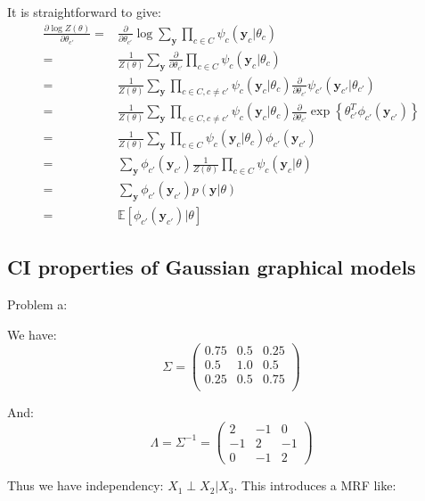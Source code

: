 \documentclass[UTF8]{ctexart}
\begin{document}
It is straightforward to give:
\begin{align}
\frac{\partial \log Z(\theta)}{\partial \theta_{c'}} = &\frac{\partial}{\partial \theta_{c'}}\log \sum_{\textbf{y}}\prod_{c \in C}\psi_{c}(\textbf{y}_{c}|\theta_{c}) \nonumber \\
=&\frac{1}{Z(\theta)}\sum_{\textbf{y}}\frac{\partial}{\partial\theta_{c'}}\prod_{c \in C}\psi_{c}(\textbf{y}_{c}|\theta_{c}) \nonumber \\
=&\frac{1}{Z(\theta)}\sum_{\textbf{y}}\prod_{c \in C,c \neq c'}\psi_{c}(\textbf{y}_{c}|\theta_{c})\frac{\partial}{\partial\theta_{c'}}\psi_{c'}(\textbf{y}_{c'}|\theta_{c'}) \nonumber \\
=&\frac{1}{Z(\theta)}\sum_{\textbf{y}}\prod_{c \in C,c \neq c'}\psi_{c}(\textbf{y}_{c}|\theta_{c})\frac{\partial}{\partial\theta_{c'}} \exp\left\{\theta_{c'}^{T}\phi_{c'}(\textbf{y}_{c'}) \right\} \nonumber \\
=&\frac{1}{Z(\theta)}\sum_{\textbf{y}}\prod_{c \in C}\psi_{c}(\textbf{y}_{c}|\theta_{c})\phi_{c'}(\textbf{y}_{c'}) \nonumber \\
=&\sum_{\textbf{y}}\phi_{c'}(\textbf{y}_{c'})\frac{1}{Z(\theta)}\prod_{c\in C}\psi_{c}(\textbf{y}_{c}|\theta) \nonumber \\
=&\sum_{\textbf{y}}\phi_{c'}(\textbf{y}_{c'})p(\textbf{y}|\theta) \nonumber \\
=&\mathbb{E}[\phi_{c'}(\textbf{y}_{c'})|\theta] \nonumber 
\end{align}

\subsection{CI properties of Gaussian graphical models}
Problem a:

We have:
$$\Sigma = \begin{pmatrix} 0.75 & 0.5 & 0.25 \\ 0.5 & 1.0 & 0.5 \\ 0.25 & 0.5 & 0.75 \\ \end{pmatrix}$$

And:
$$\Lambda = \Sigma^{-1} = \begin{pmatrix}2 & -1 & 0 \\-1 & 2 & -1 \\ 0 & -1 & 2 \end{pmatrix}$$

Thus we have independency: $X_{1}\perp X_{2} | X_{3}$. This introduces a MRF like:
\begin{figure}[h]
\small
\centering
{}
\end{figure}
\end{document}
